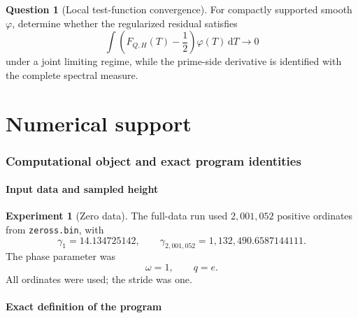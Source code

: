 \documentclass[11pt]{amsart}
\numberwithin{equation}{section}
\theoremstyle{plain}
\theoremstyle{definition}
\newtheorem{experiment}[theorem]{Experiment}
\newtheorem{question}[theorem]{Question}
\theoremstyle{remark}
\newcommand{\1}{\mathbf{1}}
\newcommand{\dd}{\,\mathrm{d}}
\begin{document}
\begin{question}[Local test-function convergence]
\label{question:local_test_functions}
For compactly supported smooth \(\varphi\), determine whether the
regularized residual satisfies
\begin{equation}
\int
\left(F_{Q,H}(T)-\frac12\right)\varphi(T)\dd T
\longrightarrow0
\label{eq:test_function_target}
\end{equation}
under a joint limiting regime, while the prime-side derivative is
identified with the complete spectral measure.
\end{question}


\part{Numerical support}

\section{Computational object and exact program identities}
\label{sec:numerical_program}

\subsection{Input data and sampled height}
\label{subsec:numerical_input_data}

\begin{experiment}[Zero data]
\label{exp:numerical_zero_data}
The full-data run used $2{,}001{,}052$ positive ordinates from
\texttt{zeross.bin}, with
\begin{equation}
\gamma_1=14.134725142,
\qquad
\gamma_{2{,}001{,}052}=1{,}132{,}490.6587144111.
\label{eq:numerical_zero_endpoints_detailed}
\end{equation}
The phase parameter was
\begin{equation}
\omega=1,
\qquad q=e.
\label{eq:numerical_omega}
\end{equation}
All ordinates were used; the stride was one.
\end{experiment}

\subsection{Exact definition of the program}
\label{subsec:exact_program_definition}
\end{document}
